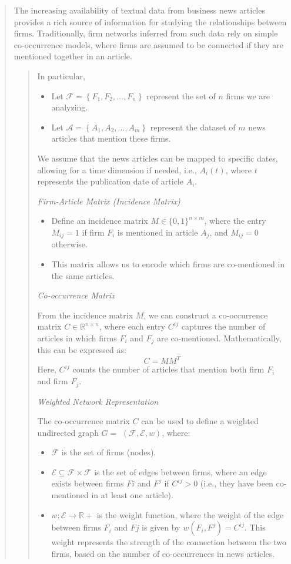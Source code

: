 \begin{quote}
The increasing availability of textual data from business news articles provides a rich source of information for studying the relationships between firms. Traditionally, firm networks inferred from such data rely on simple co-occurrence models, where firms are assumed to be connected if they are mentioned together in an article. 

\begin{quote}
In particular, 
\begin{itemize}
  \item Let $\mathcal{F}=\left\{F_1, F_2, \ldots, F_n\right\}$ represent the set of $n$ firms we are analyzing.
  \item Let $\mathcal{A}=\left\{A_1, A_2, \ldots, A_m\right\}$ represent the dataset of $m$ news articles that mention these firms.
\end{itemize}
We assume that the news articles can be mapped to specific dates, allowing for a time dimension if needed, i.e., $A_i(t)$, where $t$ represents the publication date of article $A_i$.

\textit{Firm-Article Matrix (Incidence Matrix)}

\begin{itemize}
  \item Define an incidence matrix $M \in\{0,1\}^{n \times m}$, where the entry $M_{i j}=1$ if firm $F_i$ is mentioned in article $A_j$, and $M_{i j}=0$ otherwise.
  \item This matrix allows us to encode which firms are co-mentioned in the same articles.
\end{itemize}

\textit{Co-occurrence Matrix}

From the incidence matrix $M$, we can construct a co-occurrence matrix $C \in \mathbb{R}^{n \times n}$, where each entry $C^{i j}$ captures the number of articles in which firms $F_i$ and $F_j$ are co-mentioned.
Mathematically, this can be expressed as:
$$
C=M M^T
$$
Here, $C^{i j}$ counts the number of articles that mention both firm $F_i$ and firm $F_j$.


\textit{Weighted Network Representation}

The co-occurrence matrix $C$ can be used to define a weighted undirected graph $G=$ $(\mathcal{F}, \mathcal{E}, w)$, where:
\begin{itemize}
  \item $\mathcal{F}$ is the set of firms (nodes).
  \item $\mathcal{E} \subseteq \mathcal{F} \times \mathcal{F}$ is the set of edges between firms, where an edge exists between firms $F i$ and $F^j$ if $C^{i j}>0$ (i.e., they have been co-mentioned in at least one article).
  \item $w: \mathcal{E} \rightarrow \mathbb{R}+$ is the weight function, where the weight of the edge between firms $F_i$ and $F j$ is given by $w\left(F_i, F^j\right)=C^{i j}$. This weight represents the strength of the connection between the two firms, based on the number of co-occurrences in news articles.
\end{itemize}


\end{quote}
\end{quote}

